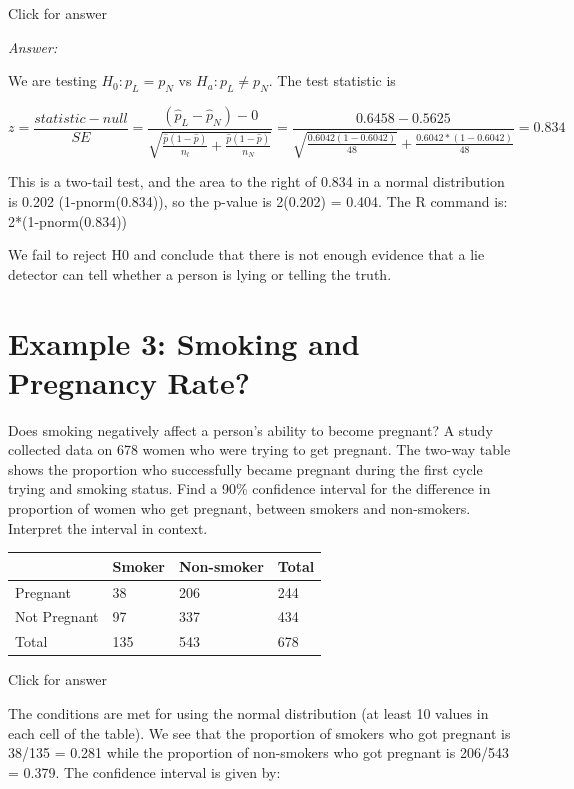 \documentclass[
]{book}
\begin{document}
Click for answer

\emph{Answer:}

We are testing \(H_0:p_L = p_N\) vs \(H_a:p_L \neq p_N\). The test statistic is

\[z = \frac{statistic-null}{SE} = \frac{(\hat{p}_L - \hat{p}_N) - 0}{\sqrt{\frac{\hat{p}(1-\hat{p})}{n_l} + \frac{\hat{p}(1-\hat{p})}{n_N}}} = \frac{0.6458 - 0.5625}{\sqrt{\frac{0.6042(1-0.6042)}{48}} + \frac{0.6042*(1-0.6042)}{48}} = 0.834 \]

This is a two-tail test, and the area to the right of 0.834 in a normal distribution is 0.202 (1-pnorm(0.834)), so the p-value is 2(0.202) = 0.404. The R command is: 2*(1-pnorm(0.834))

We fail to reject H0 and conclude that there is not enough evidence that a lie detector can tell whether a person is lying or telling the truth.

\hypertarget{example-3-smoking-and-pregnancy-rate}{%
\section{Example 3: Smoking and Pregnancy Rate?}\label{example-3-smoking-and-pregnancy-rate}}

Does smoking negatively affect a person's ability to become pregnant? A study collected data on 678 women who were trying to get pregnant. The two-way table shows the proportion who successfully became pregnant during the first cycle trying and smoking status. Find a 90\% confidence interval for the difference in proportion of women who get pregnant, between smokers and non-smokers. Interpret the interval in context.

\begin{longtable}[]{@{}llll@{}}
\toprule()
~ & Smoker & Non-smoker & Total \\
\midrule()
\endhead
Pregnant & 38 & 206 & 244 \\
Not Pregnant & 97 & 337 & 434 \\
Total & 135 & 543 & 678 \\
\bottomrule()
\end{longtable}

Click for answer

The conditions are met for using the normal distribution (at least 10 values in each cell of the table). We see that the proportion of smokers who got pregnant is 38/135 = 0.281 while the proportion of non-smokers who got pregnant is 206/543 = 0.379. The confidence interval is given by:
\end{document}
